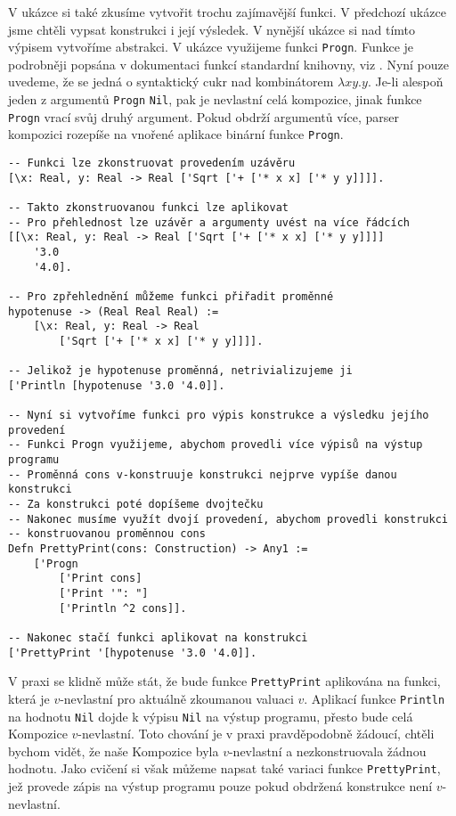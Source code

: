 V ukázce si také zkusíme vytvořit trochu zajímavější funkci. V předchozí ukázce jsme chtěli vypsat
konstrukci i její výsledek. V nynější ukázce si nad tímto výpisem vytvoříme abstrakci. V ukázce
využijeme funkci \lstinline{Progn}. Funkce je podrobněji popsána v dokumentaci funkcí standardní
knihovny, viz . Nyní pouze uvedeme, že se jedná o syntaktický cukr
nad kombinátorem $\lambda x y . y$. Je-li alespoň jeden z argumentů \lstinline{Progn} \lstinline{Nil},
pak je nevlastní celá kompozice, jinak funkce \lstinline{Progn} vrací svůj druhý argument. Pokud
obdrží argumentů více, parser kompozici rozepíše na vnořené aplikace binární funkce
\lstinline{Progn}.

\begin{lstlisting}[caption={Funkce a uzávěry}, language=Tilscript]
-- Funkci lze zkonstruovat provedením uzávěru
[\x: Real, y: Real -> Real ['Sqrt ['+ ['* x x] ['* y y]]]].

-- Takto zkonstruovanou funkci lze aplikovat
-- Pro přehlednost lze uzávěr a argumenty uvést na více řádcích
[[\x: Real, y: Real -> Real ['Sqrt ['+ ['* x x] ['* y y]]]]
    '3.0
    '4.0].

-- Pro zpřehlednění můžeme funkci přiřadit proměnné
hypotenuse -> (Real Real Real) :=
    [\x: Real, y: Real -> Real
        ['Sqrt ['+ ['* x x] ['* y y]]]].

-- Jelikož je hypotenuse proměnná, netrivializujeme ji
['Println [hypotenuse '3.0 '4.0]].

-- Nyní si vytvoříme funkci pro výpis konstrukce a výsledku jejího provedení
-- Funkci Progn využijeme, abychom provedli více výpisů na výstup programu
-- Proměnná cons v-konstruuje konstrukci nejprve vypíše danou konstrukci
-- Za konstrukci poté dopíšeme dvojtečku
-- Nakonec musíme využít dvojí provedení, abychom provedli konstrukci
-- konstruovanou proměnnou cons
Defn PrettyPrint(cons: Construction) -> Any1 :=
    ['Progn
        ['Print cons]
        ['Print '": "]
        ['Println ^2 cons]].

-- Nakonec stačí funkci aplikovat na konstrukci
['PrettyPrint '[hypotenuse '3.0 '4.0]].
\end{lstlisting}

V praxi se klidně může stát, že bude funkce \lstinline{PrettyPrint} aplikována na funkci,
která je $v$-nevlastní pro aktuálně zkoumanou valuaci $v$. Aplikací funkce \lstinline{Println}
na hodnotu \lstinline{Nil} dojde k výpisu \lstinline{Nil} na výstup programu, přesto bude celá
Kompozice $v$-nevlastní. Toto chování je v praxi pravděpodobně žádoucí, chtěli bychom vidět, že naše
Kompozice byla $v$-nevlastní a nezkonstruovala žádnou hodnotu. Jako cvičení si však můžeme napsat
také variaci funkce \lstinline{PrettyPrint}, jež provede zápis na výstup programu pouze pokud
obdržená konstrukce není $v$-nevlastní.


